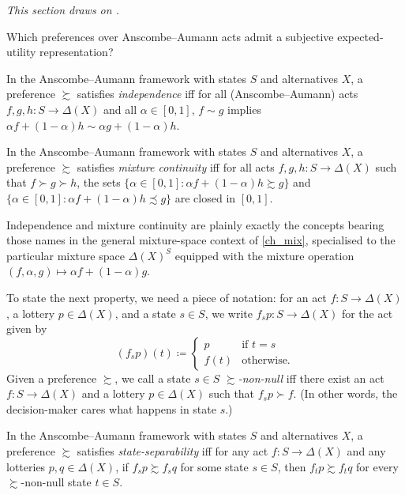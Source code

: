 \emph{This section draws on \textcite[chapter~7]{Kreps1988}.}

Which preferences over Anscombe--Aumann acts admit a subjective expected-utility representation?

\begin{definition}
	\label{definition:aa_indep}
	In the Anscombe--Aumann framework with states $S$ and alternatives $X$, a preference $\succsim$ satisfies \emph{independence} iff for all (Anscombe--Aumann) acts $f,g,h : S \to \Delta(X)$ and all $\alpha \in [0,1]$, $f \sim g$ implies $\alpha f + (1-\alpha) h \sim \alpha g + (1-\alpha) h$.
\end{definition}

\begin{definition}
	\label{definition:aa_continuity}
	In the Anscombe--Aumann framework with states $S$ and alternatives $X$, a preference $\succsim$ satisfies \emph{mixture continuity} iff for all acts $f,g,h : S \to \Delta(X)$ such that $f \succ g \succ h$, the sets $\{ \alpha \in [0,1] : \alpha f + (1-\alpha) h \succsim g \}$ and $\{ \alpha \in [0,1] : \alpha f + (1-\alpha) h \precsim g \}$ are closed in $[0,1]$.
\end{definition}

Independence and mixture continuity are plainly exactly the concepts bearing those names in the general mixture-space context of \cref{ch_mix}, specialised to the particular mixture space $\Delta(X)^S$ equipped with the mixture operation $(f,\alpha,g) \mapsto \alpha f + (1-\alpha) g$.

To state the next property, we need a piece of notation: for an act $f : S \to \Delta(X)$, a lottery $p \in \Delta(X)$, and a state $s \in S$, we write $f_s p : S \to \Delta(X)$ for the act given by
%
\begin{equation*}
	(f_s p)(t) \coloneqq
	\begin{cases}
		p & \text{if $t=s$} \\
		f(t) & \text{otherwise.}
	\end{cases}
\end{equation*}
%
Given a preference $\succsim$, we call a state $s \in S$ \emph{$\succsim$-non-null} iff there exist an act $f : S \to \Delta(X)$ and a lottery $p \in \Delta(X)$ such that $f_s p \succ f$. (In other words, the decision-maker cares what happens in state $s$.)

\begin{definition}
	\label{definition:aa_sub}
	In the Anscombe--Aumann framework with states $S$ and alternatives $X$, a preference $\succsim$ satisfies \emph{state-separability} iff for any act $f : S \to \Delta(X)$ and any lotteries $p,q \in \Delta(X)$, if $f_s p \succsim f_s q$ for some state $s \in S$, then $f_t p \succsim f_t q$ for every $\succsim$-non-null state $t \in S$.
\end{definition}

